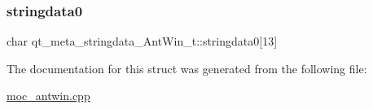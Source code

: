 \subsubsection{\texorpdfstring{stringdata0}{stringdata0}}
{\footnotesize\ttfamily char qt\+\_\+meta\+\_\+stringdata\+\_\+\+Ant\+Win\+\_\+t\+::stringdata0\mbox{[}13\mbox{]}}



The documentation for this struct was generated from the following file\+:\begin{DoxyCompactItemize}
\item 
\hyperlink{moc__antwin_8cpp}{moc\+\_\+antwin.\+cpp}\end{DoxyCompactItemize}
